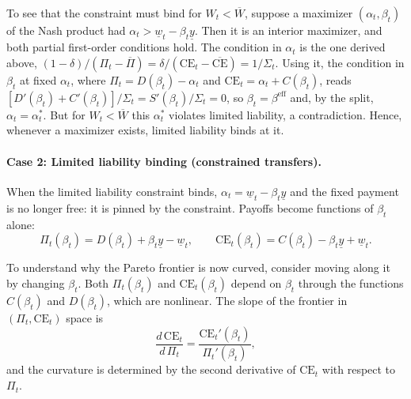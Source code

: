 \documentclass{article}
\theoremstyle{definition}
\theoremstyle{plain}
\begin{document}
To see that the constraint must bind for $W_t < \overline{W}$, suppose a maximizer $(\alpha_t,\beta_t)$ of the Nash product had $\alpha_t > \underline{w}_t - \beta_t\underline{y}$. Then it is an interior maximizer, and both partial first-order conditions hold. The condition in $\alpha_t$ is the one derived above, $(1-\delta)/(\Pi_t-\overline\Pi) = \delta/(\text{CE}_t-\overline{\text{CE}}) = 1/\Sigma_t$. Using it, the condition in $\beta_t$ at fixed $\alpha_t$, where $\Pi_t = D(\beta_t)-\alpha_t$ and $\text{CE}_t = \alpha_t + C(\beta_t)$, reads $[D'(\beta_t)+C'(\beta_t)]/\Sigma_t = S'(\beta_t)/\Sigma_t = 0$, so $\beta_t = \beta^{\text{eff}}$ and, by the split, $\alpha_t = \alpha_t^*$. But for $W_t < \overline{W}$ this $\alpha_t^*$ violates limited liability, a contradiction. Hence, whenever a maximizer exists, limited liability binds at it.

\paragraph{Case 2: Limited liability binding (constrained transfers).}

When the limited liability constraint binds, $\alpha_t = \underline{w}_t - \beta_t \underline{y}$ and the fixed payment is no longer free: it is pinned by the constraint. Payoffs become functions of $\beta_t$ alone:
\[
\Pi_t(\beta_t) = D(\beta_t) + \beta_t \underline{y} - \underline{w}_t, \qquad \text{CE}_t(\beta_t) = C(\beta_t) - \beta_t \underline{y} + \underline{w}_t.
\]

To understand why the Pareto frontier is now curved, consider moving along it by changing $\beta_t$. Both $\Pi_t(\beta_t)$ and $\text{CE}_t(\beta_t)$ depend on $\beta_t$ through the functions $C(\beta_t)$ and $D(\beta_t)$, which are nonlinear. The slope of the frontier in $(\Pi_t, \text{CE}_t)$ space is
\[
\frac{d\,\text{CE}_t}{d\,\Pi_t} = \frac{\text{CE}_t'(\beta_t)}{\Pi_t'(\beta_t)},
\]
and the curvature is determined by the second derivative of $\text{CE}_t$ with respect to $\Pi_t$.
\end{document}
